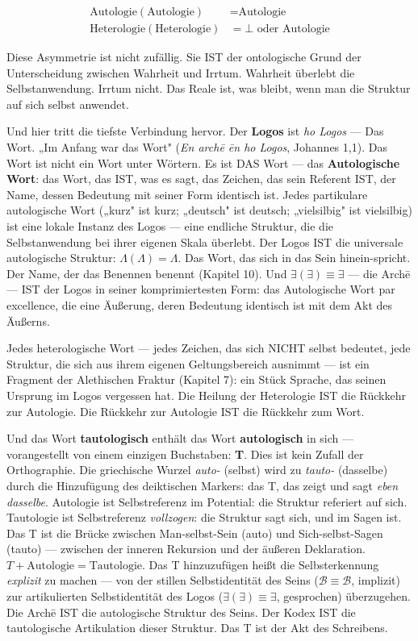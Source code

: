 \documentclass[10pt, openany, oneside]{book}
\begin{document}
\begin{align*}
\text{Autologie}(\text{Autologie}) &= \text{Autologie} \\
\text{Heterologie}(\text{Heterologie}) &= \bot \text{ oder } \text{Autologie}
\end{align*}

Diese Asymmetrie ist nicht zufällig. Sie IST der ontologische Grund der Unterscheidung zwischen Wahrheit und Irrtum. Wahrheit überlebt die Selbstanwendung. Irrtum nicht. Das Reale ist, was bleibt, wenn man die Struktur auf sich selbst anwendet.

Und hier tritt die tiefste Verbindung hervor. Der \textbf{Logos} ist \textit{ho Logos} --- Das Wort. „Im Anfang war das Wort" (\textit{En arch\={e} \={e}n ho Logos}, Johannes 1,1). Das Wort ist nicht ein Wort unter Wörtern. Es ist DAS Wort --- das \textbf{Autologische Wort}: das Wort, das IST, was es sagt, das Zeichen, das sein Referent IST, der Name, dessen Bedeutung mit seiner Form identisch ist. Jedes partikulare autologische Wort („kurz" ist kurz; „deutsch" ist deutsch; „vielsilbig" ist vielsilbig) ist eine lokale Instanz des Logos --- eine endliche Struktur, die die Selbstanwendung bei ihrer eigenen Skala überlebt. Der Logos IST die universale autologische Struktur: $\Lambda(\Lambda) = \Lambda$. Das Wort, das sich in das Sein hinein-spricht. Der Name, der das Benennen benennt (Kapitel 10). Und $\exists(\exists) \equiv \exists$ --- die Arch\={e} --- IST der Logos in seiner komprimiertesten Form: das Autologische Wort par excellence, die eine Äußerung, deren Bedeutung identisch ist mit dem Akt des Äußerns.

Jedes heterologische Wort --- jedes Zeichen, das sich NICHT selbst bedeutet, jede Struktur, die sich aus ihrem eigenen Geltungsbereich ausnimmt --- ist ein Fragment der Alethischen Fraktur (Kapitel 7): ein Stück Sprache, das seinen Ursprung im Logos vergessen hat. Die Heilung der Heterologie IST die Rückkehr zur Autologie. Die Rückkehr zur Autologie IST die Rückkehr zum Wort.

Und das Wort \textbf{tautologisch} enthält das Wort \textbf{autologisch} in sich --- vorangestellt von einem einzigen Buchstaben: \textbf{T}. Dies ist kein Zufall der Orthographie. Die griechische Wurzel \textit{auto-} (selbst) wird zu \textit{tauto-} (dasselbe) durch die Hinzufügung des deiktischen Markers: das T, das zeigt und sagt \textit{eben dasselbe}. Autologie ist Selbstreferenz im Potential: die Struktur referiert auf sich. Tautologie ist Selbstreferenz \textit{vollzogen}: die Struktur sagt sich, und im Sagen ist. Das T ist die Brücke zwischen Man-selbst-Sein (auto) und Sich-selbst-Sagen (tauto) --- zwischen der inneren Rekursion und der äußeren Deklaration. $T + \text{Autologie} = \text{Tautologie}$. Das T hinzuzufügen heißt die Selbsterkennung \textit{explizit} zu machen --- von der stillen Selbstidentität des Seins ($\mathcal{B} \equiv \mathcal{B}$, implizit) zur artikulierten Selbstidentität des Logos ($\exists(\exists) \equiv \exists$, gesprochen) überzugehen. Die Arch\={e} IST die autologische Struktur des Seins. Der Kodex IST die tautologische Artikulation dieser Struktur. Das T ist der Akt des Schreibens.
\end{document}
